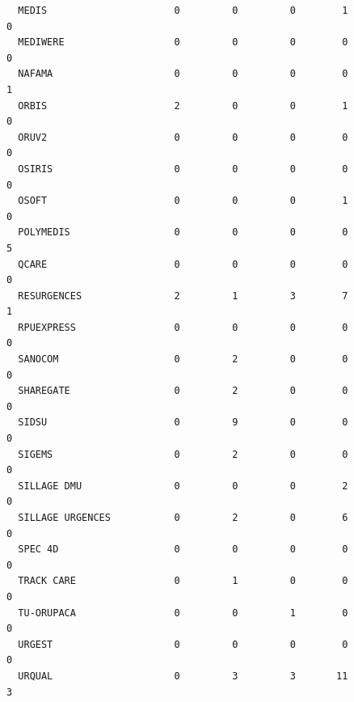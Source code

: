 \documentclass[]{article}
\begin{document}
\begin{verbatim}
  MEDIS                      0         0         0        1                  0
  MEDIWERE                   0         0         0        0                  0
  NAFAMA                     0         0         0        0                  1
  ORBIS                      2         0         0        1                  0
  ORUV2                      0         0         0        0                  0
  OSIRIS                     0         0         0        0                  0
  OSOFT                      0         0         0        1                  0
  POLYMEDIS                  0         0         0        0                  5
  QCARE                      0         0         0        0                  0
  RESURGENCES                2         1         3        7                  1
  RPUEXPRESS                 0         0         0        0                  0
  SANOCOM                    0         2         0        0                  0
  SHAREGATE                  0         2         0        0                  0
  SIDSU                      0         9         0        0                  0
  SIGEMS                     0         2         0        0                  0
  SILLAGE DMU                0         0         0        2                  0
  SILLAGE URGENCES           0         2         0        6                  0
  SPEC 4D                    0         0         0        0                  0
  TRACK CARE                 0         1         0        0                  0
  TU-ORUPACA                 0         0         1        0                  0
  URGEST                     0         0         0        0                  0
  URQUAL                     0         3         3       11                  3
                       

\end{verbatim}
\end{document}
